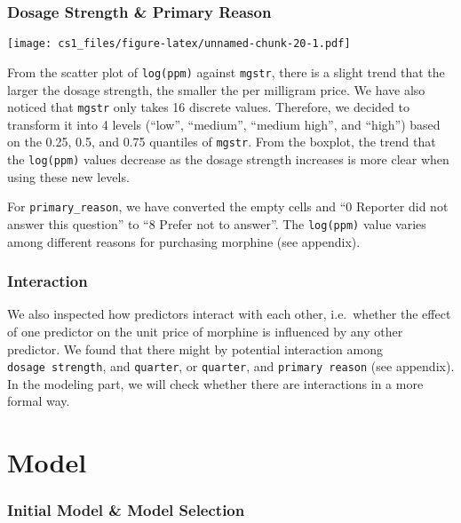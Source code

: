 \documentclass[
  11pt,
]{article}
\begin{document}
\hypertarget{dosage-strength-primary-reason}{%
\subsubsection{Dosage Strength \& Primary
Reason}\label{dosage-strength-primary-reason}}

\texttt{[image: cs1\_files/figure-latex/unnamed-chunk-20-1.pdf]}

From the scatter plot of \texttt{log(ppm)} against \texttt{mgstr}, there
is a slight trend that the larger the dosage strength, the smaller the
per milligram price. We have also noticed that \texttt{mgstr} only takes
16 discrete values. Therefore, we decided to transform it into 4 levels
(``low'', ``medium'', ``medium high'', and ``high'') based on the 0.25,
0.5, and 0.75 quantiles of \texttt{mgstr}. From the boxplot, the trend
that the \texttt{log(ppm)} values decrease as the dosage strength
increases is more clear when using these new levels.

For \texttt{primary\_reason}, we have converted the empty cells and ``0
Reporter did not answer this question'' to ``8 Prefer not to answer''.
The \texttt{log(ppm)} value varies among different reasons for
purchasing morphine (see appendix).

\hypertarget{interaction}{%
\subsubsection{Interaction}\label{interaction}}

We also inspected how predictors interact with each other, i.e.~whether
the effect of one predictor on the unit price of morphine is influenced
by any other predictor. We found that there might by potential
interaction among \texttt{dosage\ strength}, and \texttt{quarter}, or
\texttt{quarter}, and \texttt{primary\ reason} (see appendix). In the
modeling part, we will check whether there are interactions in a more
formal way.

\hypertarget{model}{%
\section{Model}\label{model}}

\hypertarget{initial-model-model-selection}{%
\subsubsection{Initial Model \& Model
Selection}\label{initial-model-model-selection}}
\end{document}
